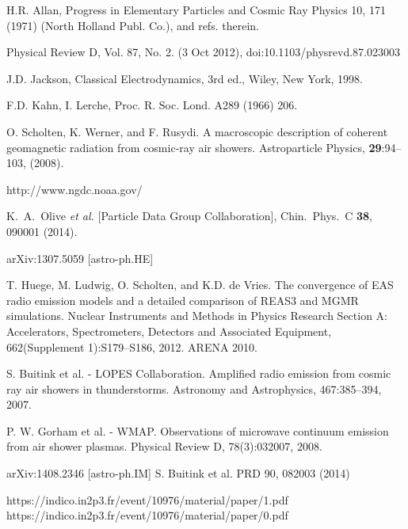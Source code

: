 \begin{thebibliography}{1}


 H.R. Allan, Progress in Elementary Particles and Cosmic Ray Physics 10, 171 (1971) (North Holland Publ. Co.), and refs. therein.

 Physical Review D, Vol. 87, No. 2. (3 Oct 2012), doi:10.1103/physrevd.87.023003 

 J.D. Jackson, Classical Electrodynamics, 3rd ed., Wiley, New York, 1998.

 F.D. Kahn, I. Lerche, Proc. R. Soc. Lond. A289 (1966) 206.

 O. Scholten, K. Werner, and F. Rusydi. A macroscopic description of coherent geomagnetic radiation from cosmic-ray air showers. Astroparticle Physics, {\bf 29}:94–103, (2008).

 http://www.ngdc.noaa.gov/

  K.~A.~Olive {\it et al.}  [Particle Data Group Collaboration],
  Chin.\ Phys.\ C {\bf 38}, 090001 (2014).

 arXiv:1307.5059 [astro-ph.HE]

 T. Huege, M. Ludwig, O. Scholten, and K.D. de Vries. The convergence of EAS radio emission models and a detailed comparison of REAS3 and MGMR simulations. Nuclear Instruments and Methods in Physics Research Section A: Accelerators, Spectrometers, Detectors and Associated Equipment, 662(Supplement 1):S179–S186, 2012. ARENA 2010.

 S. Buitink et al. - LOPES Collaboration. Amplified radio emission from cosmic ray air showers in thunderstorms. Astronomy and Astrophysics, 467:385–394, 2007.
 

 P. W. Gorham et al. - WMAP. Observations of microwave continuum emission from air shower plasmas. Physical Review D, 78(3):032007, 2008.

 
 arXiv:1408.2346 [astro-ph.IM]
 S. Buitink et al. PRD 90, 082003 (2014)

 https://indico.in2p3.fr/event/10976/material/paper/1.pdf
 https://indico.in2p3.fr/event/10976/material/paper/0.pdf


\end{thebibliography}

